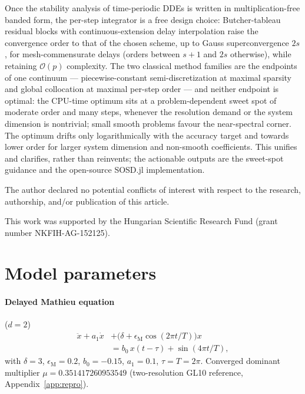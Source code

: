 \documentclass[Afour,sageh,times]{sagej}
\begin{document}
Once the stability analysis of time-periodic DDEs is written in
multiplication-free banded form, the per-step integrator is a free design
choice: Butcher-tableau residual blocks with continuous-extension delay
interpolation raise the convergence order to that of the chosen scheme, up to
Gauss superconvergence $2s$, for mesh-commensurate delays (orders between
$s{+}1$ and $2s$ otherwise), while retaining $\mathcal{O}(p)$ complexity.
The two classical method families are the endpoints of one continuum ---
piecewise-constant semi-discretization at maximal sparsity and global
collocation at maximal per-step order --- and neither endpoint is optimal:
the CPU-time optimum sits at a problem-dependent sweet spot of moderate order
and many steps, whenever the resolution demand or the system dimension is
nontrivial; small smooth problems favour the near-spectral corner. The
optimum drifts only logarithmically with the accuracy target and
towards lower order for larger system dimension and non-smooth coefficients.
This unifies and clarifies, rather than reinvents; the actionable outputs are
the sweet-spot guidance and the open-source \textsf{SOSD.jl} implementation.

\begin{dci}
The author declared no potential conflicts of interest with respect to the
research, authorship, and/or publication of this article.
\end{dci}

\begin{funding}
This work was supported by the Hungarian Scientific Research Fund (grant
number NKFIH-AG-152125).
\end{funding}

\appendix

\section{Model parameters}
\label{app:params}

\paragraph{Delayed Mathieu equation} ($d=2$)
\begin{align*}
  \ddot{x} + a_1 \dot{x} &+ \bigl(\delta + \epsilon_\mathrm{M}\cos(2\pi t/T)\bigr)x \\
  &= b_0\, x(t-\tau) + \sin(4\pi t / T),
\end{align*}
with $\delta = 3$, $\epsilon_\mathrm{M} = 0.2$, $b_0 = -0.15$, $a_1 = 0.1$,
$\tau = T = 2\pi$. Converged dominant multiplier
$\mu = 0.351417260953549$ (two-resolution GL10 reference,
Appendix~\ref{app:repro}).
\end{document}
